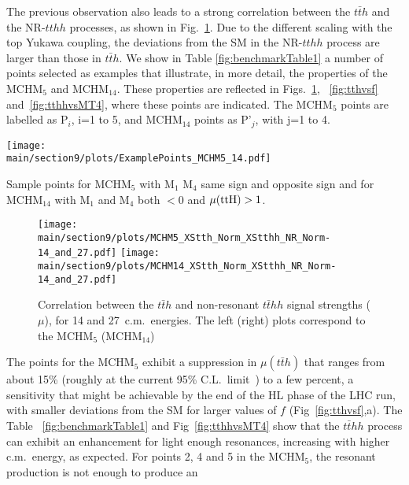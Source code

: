 The previous observation also leads to a strong correlation between the $t\bar{t}h$ and the NR-$tthh$ processes, as shown in Fig.~\ref{fig:nrtthhvstth}. Due to the different scaling with the top Yukawa coupling, the deviations from the SM in the NR-$tthh$ process are larger than those in $t\bar{t}h$.
\label{benchmarks}
We show in Table \ref{fig:benchmarkTable1} 
a number of points selected as examples that illustrate, in
more detail, the properties of the MCHM$_5$ and MCHM$_{14}$.  
These properties are reflected in Figs.~\ref{fig:nrtthhvstth}, ~\ref{fig:tthvsf} and~\ref{fig:tthhvsMT4}, where these points are indicated. The MCHM$_5$ points are labelled as P$_i$, i=1 to 5, and MCHM$_{14}$ points as P'$_j$, with j=1 to 4.
%
\begin{table}[t]
\centering
\texttt{[image: \\main/section9/plots/ExamplePoints\_MCHM5\_14.pdf]}
\caption{Sample points for MCHM$_5$ with M$_1$ M$_4$ same sign and opposite sign and for MCHM$_{14}$ with M$_1$ and M$_4$ both $<0$ and $\mu({\rm ttH})>1$.}
\label{fig:benchmarkTable1}
\end{table}
%
\begin{figure}[t]
\centering
\texttt{[image: \\main/section9/plots/MCHM5\_XStth\_Norm\_XStthh\_NR\_Norm-14\_and\_27.pdf]}
\hspace{1.5cm}
\texttt{[image: \\main/section9/plots/MCHM14\_XStth\_Norm\_XStthh\_NR\_Norm-14\_and\_27.pdf]}
\caption{Correlation between the $t\bar{t}h$ and
non-resonant $t\bar{t}hh$ signal strengths ($\mu$), for 14 and 27~\UTeV c.m.~energies. The left (right) plots correspond to the MCHM$_5$ (MCHM$_{14}$)}
\label{fig:nrtthhvstth}
\end{figure}
%
The points for the MCHM$_5$ exhibit a suppression in $\mu(t\bar{t}h)$ that ranges from about 15\% (roughly at the current
95\% C.L.~limit~\cite{Aaboud:2018urx, Sirunyan:2018hoz}) to a few
percent, a sensitivity that might be achievable by the end of the HL
phase of the LHC run, with smaller deviations from the SM for larger values of $f$ (Fig~\ref{fig:tthvsf},a). The Table ~\ref{fig:benchmarkTable1} and Fig~\ref{fig:tthhvsMT4} show that the
$t\bar{t}hh$ process can exhibit an enhancement for light enough
resonances, increasing with higher c.m.~energy, as expected. For points 2, 4 and 5 in the MCHM$_{5}$, the resonant production is not enough to produce an
